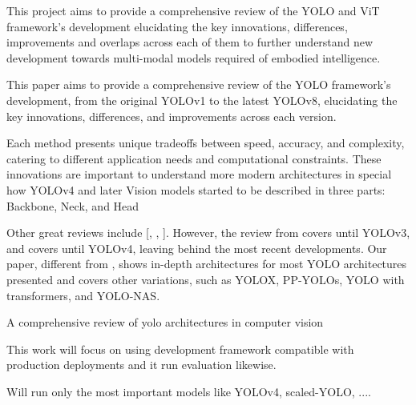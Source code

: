 \documentclass{article}
\begin{document}
This project aims to provide a comprehensive review of the YOLO and ViT framework’s development elucidating the key innovations, differences, improvements and overlaps across each of them to further understand new development towards multi-modal models required of embodied intelligence.


This paper aims to provide a comprehensive review of the YOLO framework’s development, from the original YOLOv1 to the latest YOLOv8, elucidating the key innovations, differences, and improvements across each version.

Each method presents unique tradeoffs between speed, accuracy, and complexity, catering to different application needs and computational constraints. These innovations are important to understand more modern architectures in special how YOLOv4 and later Vision models started to be described in three parts: Backbone, Neck, and Head


Other great reviews include [\cite{bhavya2021inter}, \cite{diwan2023object}, \cite{hussain2023yolo}]. However, the review from \cite{bhavya2021inter} covers until YOLOv3, and \cite{diwan2023object} covers until YOLOv4, leaving behind the most recent developments. Our paper, different from \cite{hussain2023yolo}, shows in-depth architectures for most YOLO architectures presented and covers other variations, such as YOLOX, PP-YOLOs, YOLO with transformers, and YOLO-NAS.

A comprehensive review of yolo architectures in computer vision \cite{terven2023comprehensive}

This work will focus on using development framework compatible with production deployments and it run evaluation likewise.

Will run only the most important models like YOLOv4, scaled-YOLO, ....



\end{document}
